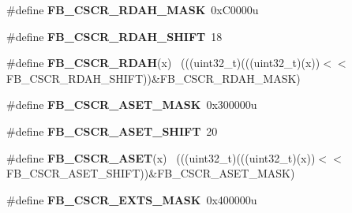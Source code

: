 \begin{DoxyCompactItemize}
\item 
\hypertarget{group___f_b___register___masks_ga31adeea4793143604b28e1ca000b19df}{}\#define {\bfseries F\+B\+\_\+\+C\+S\+C\+R\+\_\+\+R\+D\+A\+H\+\_\+\+M\+A\+S\+K}~0x\+C0000u\label{group___f_b___register___masks_ga31adeea4793143604b28e1ca000b19df}

\item 
\hypertarget{group___f_b___register___masks_gaade1cbb82ddd98295330c376eabcca7e}{}\#define {\bfseries F\+B\+\_\+\+C\+S\+C\+R\+\_\+\+R\+D\+A\+H\+\_\+\+S\+H\+I\+F\+T}~18\label{group___f_b___register___masks_gaade1cbb82ddd98295330c376eabcca7e}

\item 
\hypertarget{group___f_b___register___masks_gaaf84ac11233be76a448b3d17a6f844c8}{}\#define {\bfseries F\+B\+\_\+\+C\+S\+C\+R\+\_\+\+R\+D\+A\+H}(x)                                                ~(((uint32\+\_\+t)(((uint32\+\_\+t)(x))$<$$<$F\+B\+\_\+\+C\+S\+C\+R\+\_\+\+R\+D\+A\+H\+\_\+\+S\+H\+I\+F\+T))\&F\+B\+\_\+\+C\+S\+C\+R\+\_\+\+R\+D\+A\+H\+\_\+\+M\+A\+S\+K)\label{group___f_b___register___masks_gaaf84ac11233be76a448b3d17a6f844c8}

\item 
\hypertarget{group___f_b___register___masks_gaef9bac6317316a7b6d4e2df3526b206f}{}\#define {\bfseries F\+B\+\_\+\+C\+S\+C\+R\+\_\+\+A\+S\+E\+T\+\_\+\+M\+A\+S\+K}~0x300000u\label{group___f_b___register___masks_gaef9bac6317316a7b6d4e2df3526b206f}

\item 
\hypertarget{group___f_b___register___masks_ga287d608bea3c47b85bdd3d707460da64}{}\#define {\bfseries F\+B\+\_\+\+C\+S\+C\+R\+\_\+\+A\+S\+E\+T\+\_\+\+S\+H\+I\+F\+T}~20\label{group___f_b___register___masks_ga287d608bea3c47b85bdd3d707460da64}

\item 
\hypertarget{group___f_b___register___masks_gae8f1fb8db1ad4008018e37bb78c9338a}{}\#define {\bfseries F\+B\+\_\+\+C\+S\+C\+R\+\_\+\+A\+S\+E\+T}(x)                                                ~(((uint32\+\_\+t)(((uint32\+\_\+t)(x))$<$$<$F\+B\+\_\+\+C\+S\+C\+R\+\_\+\+A\+S\+E\+T\+\_\+\+S\+H\+I\+F\+T))\&F\+B\+\_\+\+C\+S\+C\+R\+\_\+\+A\+S\+E\+T\+\_\+\+M\+A\+S\+K)\label{group___f_b___register___masks_gae8f1fb8db1ad4008018e37bb78c9338a}

\item 
\hypertarget{group___f_b___register___masks_ga1bc7960fd554faa076ba6e34fddaf081}{}\#define {\bfseries F\+B\+\_\+\+C\+S\+C\+R\+\_\+\+E\+X\+T\+S\+\_\+\+M\+A\+S\+K}~0x400000u\label{group___f_b___register___masks_ga1bc7960fd554faa076ba6e34fddaf081}


\end{DoxyCompactItemize}
